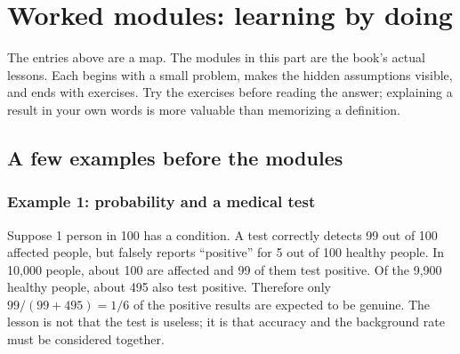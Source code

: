 \documentclass[11pt,oneside]{book}
\begin{document}














































\part{Worked modules: learning by doing}
The entries above are a map. The modules in this part are the book's actual lessons. Each begins with a small problem, makes the hidden assumptions visible, and ends with exercises. Try the exercises before reading the answer; explaining a result in your own words is more valuable than memorizing a definition.

\chapter{A few examples before the modules}
\section*{Example 1: probability and a medical test}
Suppose 1 person in 100 has a condition. A test correctly detects 99 out of 100 affected people, but falsely reports ``positive'' for 5 out of 100 healthy people. In 10,000 people, about 100 are affected and 99 of them test positive. Of the 9,900 healthy people, about 495 also test positive. Therefore only $99/(99+495)=1/6$ of the positive results are expected to be genuine. The lesson is not that the test is useless; it is that accuracy and the background rate must be considered together.
\end{document}
